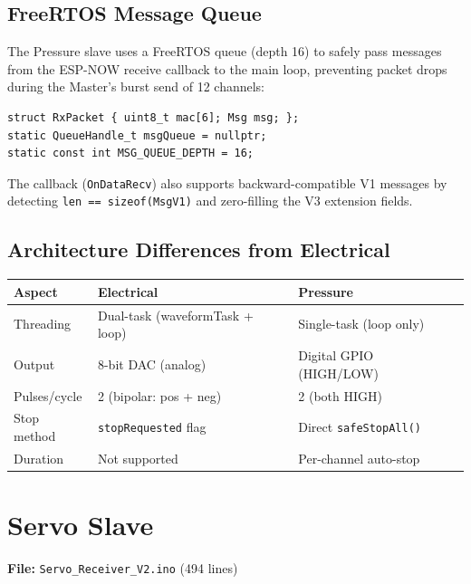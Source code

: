 \documentclass[11pt,a4paper]{article}
\begin{document}
\subsection{FreeRTOS Message Queue}

The Pressure slave uses a FreeRTOS queue (depth 16) to safely pass messages from
the ESP-NOW receive callback to the main loop, preventing packet drops during
the Master's burst send of 12 channels:

\begin{lstlisting}[style=cppstyle]
struct RxPacket { uint8_t mac[6]; Msg msg; };
static QueueHandle_t msgQueue = nullptr;
static const int MSG_QUEUE_DEPTH = 16;
\end{lstlisting}

The callback (\texttt{OnDataRecv}) also supports backward-compatible V1 messages
by detecting \texttt{len == sizeof(MsgV1)} and zero-filling the V3 extension fields.

\subsection{Architecture Differences from Electrical}

\begin{center}
\begin{tabular}{lll}
\toprule
\textbf{Aspect} & \textbf{Electrical} & \textbf{Pressure} \\
\midrule
Threading    & Dual-task (waveformTask + loop) & Single-task (loop only) \\
Output       & 8-bit DAC (analog)              & Digital GPIO (HIGH/LOW) \\
Pulses/cycle & 2 (bipolar: pos + neg)          & 2 (both HIGH) \\
Stop method  & \texttt{stopRequested} flag      & Direct \texttt{safeStopAll()} \\
Duration     & Not supported                    & Per-channel auto-stop \\
\bottomrule
\end{tabular}
\end{center}

\section{Servo Slave}

\textbf{File:} \texttt{Servo\_Receiver\_V2.ino} (494 lines)
\end{document}

